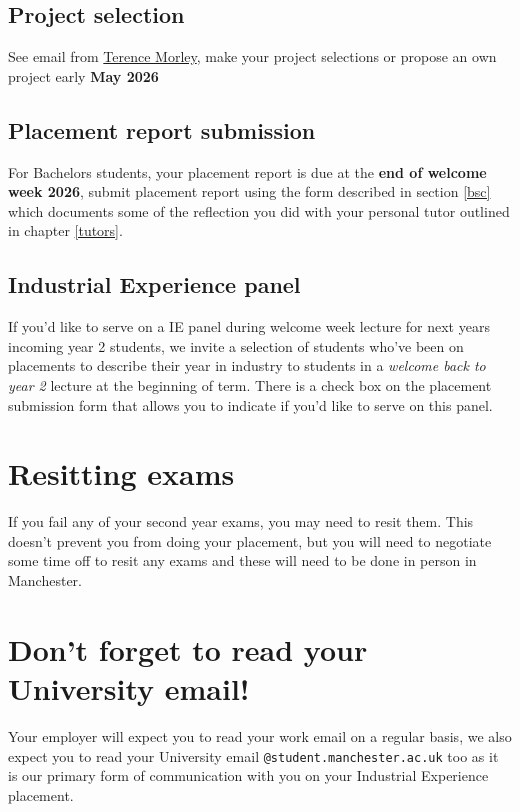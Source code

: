 \documentclass[
]{book}
\begin{document}
\subsection{Project selection}\label{four}

See email from \href{https://research.manchester.ac.uk/en/persons/terence.morley}{Terence Morley}, make your project selections or propose an own project early \textbf{May 2026}

\subsection{Placement report submission}\label{five}

For Bachelors students, your placement report is due at the \textbf{end of welcome week 2026}, submit placement report using the form described in section \ref{bsc} which documents some of the reflection you did with your personal tutor outlined in chapter \ref{tutors}.

\subsection{Industrial Experience panel}\label{six}

If you'd like to serve on a IE panel during welcome week lecture for next years incoming year 2 students, we invite a selection of students who've been on placements to describe their year in industry to students in a \emph{welcome back to year 2} lecture at the beginning of term. There is a check box on the placement submission form that allows you to indicate if you'd like to serve on this panel.

\section{Resitting exams}\label{resits}

If you fail any of your second year exams, you may need to resit them. This doesn't prevent you from doing your placement, but you will need to negotiate some time off to resit any exams and these will need to be done in person in Manchester. \citep{resits}

\section{Don't forget to read your University email!}\label{email}

Your employer will expect you to read your work email on a regular basis, we also expect you to read your University email \texttt{@student.manchester.ac.uk} too as it is our primary form of communication with you on your Industrial Experience placement.
\end{document}
